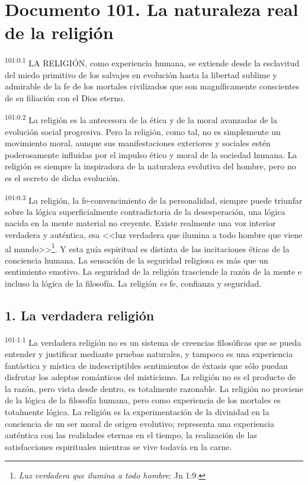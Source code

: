 \documentclass[twoside, 11pt]{book}
\begin{document}
\chapter{Documento 101. La naturaleza real de la religión}
\par
\textsuperscript{101:0.1} LA RELIGIÓN, como experiencia humana, se extiende desde la esclavitud del miedo primitivo de los salvajes en evolución hasta la libertad sublime y admirable de la fe de los mortales civilizados que son magníficamente conscientes de su filiación con el Dios eterno.

\par
\textsuperscript{101:0.2} La religión es la antecesora de la ética y de la moral avanzadas de la evolución social progresiva. Pero la religión, como tal, no es simplemente un movimiento moral, aunque sus manifestaciones exteriores y sociales estén poderosamente influidas por el impulso ético y moral de la sociedad humana. La religión es siempre la inspiradora de la naturaleza evolutiva del hombre, pero no es el secreto de dicha evolución.

\par
\textsuperscript{101:0.3} La religión, la fe-convencimiento de la personalidad, siempre puede triunfar sobre la lógica superficialmente contradictoria de la desesperación, una lógica nacida en la mente material no creyente. Existe realmente una voz interior verdadera y auténtica, esa <<luz verdadera que ilumina a todo hombre que viene al mundo>>\footnote{\textit{Luz verdadera que ilumina a todo hombre}: Jn 1:9.}. Y esta guía espiritual es distinta de las incitaciones éticas de la conciencia humana. La sensación de la seguridad religiosa es más que un sentimiento emotivo. La seguridad de la religión trasciende la razón de la mente e incluso la lógica de la filosofía. La religión \textit{es} fe, confianza y seguridad.

\section*{1. La verdadera religión}
\par
\textsuperscript{101:1.1} La verdadera religión no es un sistema de creencias filosóficas que se pueda entender y justificar mediante pruebas naturales, y tampoco es una experiencia fantástica y mística de indescriptibles sentimientos de éxtasis que sólo puedan disfrutar los adeptos románticos del misticismo. La religión no es el producto de la razón, pero vista desde dentro, es totalmente razonable. La religión no proviene de la lógica de la filosofía humana, pero como experiencia de los mortales es totalmente lógica. La religión es la experimentación de la divinidad en la conciencia de un ser moral de origen evolutivo; representa una experiencia auténtica con las realidades eternas en el tiempo, la realización de las satisfacciones espirituales mientras se vive todavía en la carne.
\end{document}
